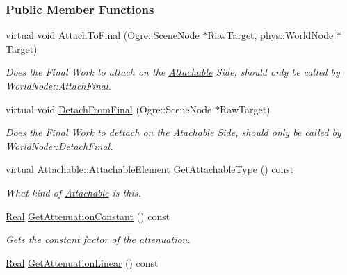 \subsubsection*{Public Member Functions}
\begin{DoxyCompactItemize}
\item 
virtual void \hyperlink{classphys_1_1Light_ab2c869364b649b9b43fed3d33432c999}{AttachToFinal} (Ogre::SceneNode $\ast$RawTarget, \hyperlink{classphys_1_1WorldNode}{phys::WorldNode} $\ast$Target)
\begin{DoxyCompactList}\small\item\em Does the Final Work to attach on the \hyperlink{classphys_1_1Attachable}{Attachable} Side, should only be called by WorldNode::AttachFinal. \item\end{DoxyCompactList}\item 
virtual void \hyperlink{classphys_1_1Light_a8a12ac91e063a57f21d4ec3a1b76261c}{DetachFromFinal} (Ogre::SceneNode $\ast$RawTarget)
\begin{DoxyCompactList}\small\item\em Does the Final Work to dettach on the Atachable Side, should only be called by WorldNode::DetachFinal. \item\end{DoxyCompactList}\item 
virtual \hyperlink{classphys_1_1Attachable_acd1fca033e7cc0bb3024a92d466d213a}{Attachable::AttachableElement} \hyperlink{classphys_1_1Light_aa592dcf3f22fc0772fb3fc85f7c3a1ae}{GetAttachableType} () const 
\begin{DoxyCompactList}\small\item\em What kind of \hyperlink{classphys_1_1Attachable}{Attachable} is this. \item\end{DoxyCompactList}\item 
\hyperlink{namespacephys_af7eb897198d265b8e868f45240230d5f}{Real} \hyperlink{classphys_1_1Light_aad30f7fb932b030de7eb15046dea83a7}{GetAttenuationConstant} () const 
\begin{DoxyCompactList}\small\item\em Gets the constant factor of the attenuation. \item\end{DoxyCompactList}\item 
\hyperlink{namespacephys_af7eb897198d265b8e868f45240230d5f}{Real} \hyperlink{classphys_1_1Light_a92245ddc5383fd7f0989866852e36ed8}{GetAttenuationLinear} () const 

\end{DoxyCompactItemize}
